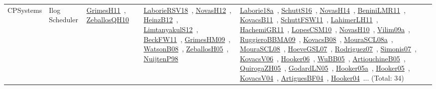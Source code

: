 {\begin{longtable}{lp{3cm}>{\raggedright\arraybackslash}p{6cm}>{\raggedright\arraybackslash}p{6cm}>{\raggedright\arraybackslash}p{8cm}}
CPSystems & Ilog Scheduler & \href{works/GrimesH11.pdf}{GrimesH11}~\cite{GrimesH11}, \href{works/ZeballosQH10.pdf}{ZeballosQH10}~\cite{ZeballosQH10} & \href{works/LaborieRSV18.pdf}{LaborieRSV18}~\cite{LaborieRSV18}, \href{works/NovasH12.pdf}{NovasH12}~\cite{NovasH12}, \href{works/HeinzB12.pdf}{HeinzB12}~\cite{HeinzB12}, \href{works/LimtanyakulS12.pdf}{LimtanyakulS12}~\cite{LimtanyakulS12}, \href{works/BeckFW11.pdf}{BeckFW11}~\cite{BeckFW11}, \href{works/GrimesHM09.pdf}{GrimesHM09}~\cite{GrimesHM09}, \href{works/WatsonB08.pdf}{WatsonB08}~\cite{WatsonB08}, \href{works/ZeballosH05.pdf}{ZeballosH05}~\cite{ZeballosH05}, \href{works/NuijtenP98.pdf}{NuijtenP98}~\cite{NuijtenP98} & \href{works/Laborie18a.pdf}{Laborie18a}~\cite{Laborie18a}, \href{works/SchuttS16.pdf}{SchuttS16}~\cite{SchuttS16}, \href{works/NovasH14.pdf}{NovasH14}~\cite{NovasH14}, \href{works/BeniniLMR11.pdf}{BeniniLMR11}~\cite{BeniniLMR11}, \href{works/KovacsB11.pdf}{KovacsB11}~\cite{KovacsB11}, \href{works/SchuttFSW11.pdf}{SchuttFSW11}~\cite{SchuttFSW11}, \href{works/LahimerLH11.pdf}{LahimerLH11}~\cite{LahimerLH11}, \href{works/HachemiGR11.pdf}{HachemiGR11}~\cite{HachemiGR11}, \href{works/LopesCSM10.pdf}{LopesCSM10}~\cite{LopesCSM10}, \href{works/NovasH10.pdf}{NovasH10}~\cite{NovasH10}, \href{works/Vilim09a.pdf}{Vilim09a}~\cite{Vilim09a}, \href{works/RuggieroBBMA09.pdf}{RuggieroBBMA09}~\cite{RuggieroBBMA09}, \href{works/KovacsB08.pdf}{KovacsB08}~\cite{KovacsB08}, \href{works/MouraSCL08a.pdf}{MouraSCL08a}~\cite{MouraSCL08a}, \href{works/MouraSCL08.pdf}{MouraSCL08}~\cite{MouraSCL08}, \href{works/HoeveGSL07.pdf}{HoeveGSL07}~\cite{HoeveGSL07}, \href{works/Rodriguez07.pdf}{Rodriguez07}~\cite{Rodriguez07}, \href{works/Simonis07.pdf}{Simonis07}~\cite{Simonis07}, \href{works/KovacsV06.pdf}{KovacsV06}~\cite{KovacsV06}, \href{works/Hooker06.pdf}{Hooker06}~\cite{Hooker06}, \href{works/WuBB05.pdf}{WuBB05}~\cite{WuBB05}, \href{works/ArtiouchineB05.pdf}{ArtiouchineB05}~\cite{ArtiouchineB05}, \href{works/QuirogaZH05.pdf}{QuirogaZH05}~\cite{QuirogaZH05}, \href{works/GodardLN05.pdf}{GodardLN05}~\cite{GodardLN05}, \href{works/Hooker05a.pdf}{Hooker05a}~\cite{Hooker05a}, \href{works/Hooker05.pdf}{Hooker05}~\cite{Hooker05}, \href{works/KovacsV04.pdf}{KovacsV04}~\cite{KovacsV04}, \href{works/ArtiguesBF04.pdf}{ArtiguesBF04}~\cite{ArtiguesBF04}, \href{works/Hooker04.pdf}{Hooker04}~\cite{Hooker04}... (Total: 34)\\

\end{longtable}}
